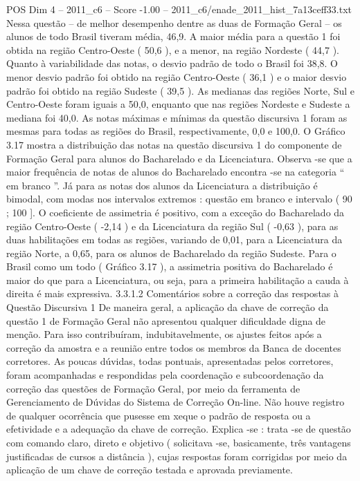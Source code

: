 \begin{textsample}{POS Dim 4 – 2011\_c6 – Score -1.00 – 2011\_c6/enade\_2011\_hist\_7a13ceff33.txt}
Nessa questão – de melhor desempenho dentre as duas de Formação Geral – os alunos de todo Brasil tiveram média, 46,9.
A maior média para a questão 1 foi obtida na região Centro-Oeste ( 50,6 ), e a menor, na região Nordeste ( 44,7 ).
Quanto à variabilidade das notas, o desvio padrão de todo o Brasil foi 38,8.
O menor desvio padrão foi obtido na região Centro-Oeste ( 36,1 ) e o maior desvio padrão foi obtido na região Sudeste ( 39,5 ).
As medianas das regiões Norte, Sul e Centro-Oeste foram iguais a 50,0, enquanto que nas regiões Nordeste e Sudeste a mediana foi 40,0.
As notas máximas e mínimas da questão discursiva 1 foram as mesmas para todas as regiões do Brasil, respectivamente, 0,0 e 100,0.
O Gráfico 3.17 mostra a distribuição das notas na questão discursiva 1 do componente de Formação Geral para alunos do Bacharelado e da Licenciatura.
Observa -se que a maior frequência de notas de alunos do Bacharelado encontra -se na categoria “ em branco ”.
Já para as notas dos alunos da Licenciatura a distribuição é bimodal, com modas nos intervalos extremos : questão em branco e intervalo ( 90 ; 100 ].
O coeficiente de assimetria é positivo, com a exceção do Bacharelado da região Centro-Oeste ( -2,14 ) e da Licenciatura da região Sul ( -0,63 ), para as duas habilitações em todas as regiões, variando de 0,01, para a Licenciatura da região Norte, a 0,65, para os alunos de Bacharelado da região Sudeste.
Para o Brasil como um todo ( Gráfico 3.17 ), a assimetria positiva do Bacharelado é maior do que para a Licenciatura, ou seja, para a primeira habilitação a cauda à direita é mais expressiva. 3.3.1.2 Comentários sobre a correção das respostas à Questão Discursiva 1 De maneira geral, a aplicação da chave de correção da questão 1 de Formação Geral não apresentou qualquer dificuldade digna de menção.
Para isso contribuíram, indubitavelmente, os ajustes feitos após a correção da amostra e a reunião entre todos os membros da Banca de docentes corretores.
As poucas dúvidas, todas pontuais, apresentadas pelos corretores, foram acompanhadas e respondidas pela coordenação e subcoordenação da correção das questões de Formação Geral, por meio da ferramenta de Gerenciamento de Dúvidas do Sistema de Correção On-line.
Não houve registro de qualquer ocorrência que pusesse em xeque o padrão de resposta ou a efetividade e a adequação da chave de correção.
Explica -se : trata -se de questão com comando claro, direto e objetivo ( solicitava -se, basicamente, três vantagens justificadas de cursos a distância ), cujas respostas foram corrigidas por meio da aplicação de um chave de correção testada e aprovada previamente.

\end{textsample}
